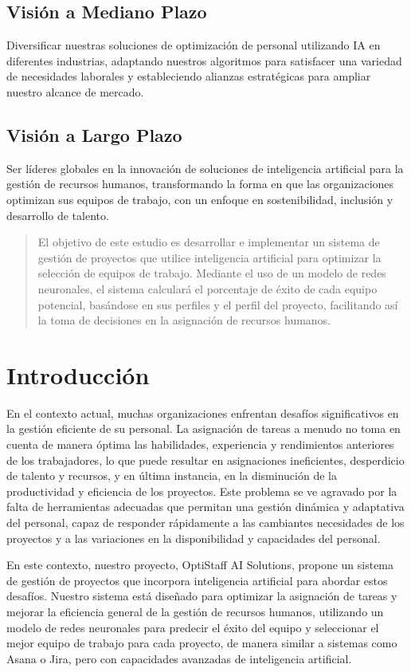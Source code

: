\documentclass{article}
\begin{document}
\subsection{Visión a Mediano Plazo}
Diversificar nuestras soluciones de optimización de personal utilizando IA en diferentes industrias, adaptando nuestros algoritmos para satisfacer una variedad de necesidades laborales y estableciendo alianzas estratégicas para ampliar nuestro alcance de mercado.

\subsection{Visión a Largo Plazo}
Ser líderes globales en la innovación de soluciones de inteligencia artificial para la gestión de recursos humanos, transformando la forma en que las organizaciones optimizan sus equipos de trabajo, con un enfoque en sostenibilidad, inclusión y desarrollo de talento.



\begin{abstract}
    El objetivo de este estudio es desarrollar e implementar un sistema de gestión de proyectos que utilice inteligencia artificial para optimizar la selección de equipos de trabajo. Mediante el uso de un modelo de redes neuronales, el sistema calculará el porcentaje de éxito de cada equipo potencial, basándose en sus perfiles y el perfil del proyecto, facilitando así la toma de decisiones en la asignación de recursos humanos.
\end{abstract}

\section{Introducción}
En el contexto actual, muchas organizaciones enfrentan desafíos significativos en la gestión eficiente de su personal. La asignación de tareas a menudo no toma en cuenta de manera óptima las habilidades, experiencia y rendimientos anteriores de los trabajadores, lo que puede resultar en asignaciones ineficientes, desperdicio de talento y recursos, y en última instancia, en la disminución de la productividad y eficiencia de los proyectos. Este problema se ve agravado por la falta de herramientas adecuadas que permitan una gestión dinámica y adaptativa del personal, capaz de responder rápidamente a las cambiantes necesidades de los proyectos y a las variaciones en la disponibilidad y capacidades del personal.

En este contexto, nuestro proyecto, OptiStaff AI Solutions, propone un sistema de gestión de proyectos que incorpora inteligencia artificial para abordar estos desafíos. Nuestro sistema está diseñado para optimizar la asignación de tareas y mejorar la eficiencia general de la gestión de recursos humanos, utilizando un modelo de redes neuronales para predecir el éxito del equipo y seleccionar el mejor equipo de trabajo para cada proyecto, de manera similar a sistemas como Asana o Jira, pero con capacidades avanzadas de inteligencia artificial.
\end{document}
